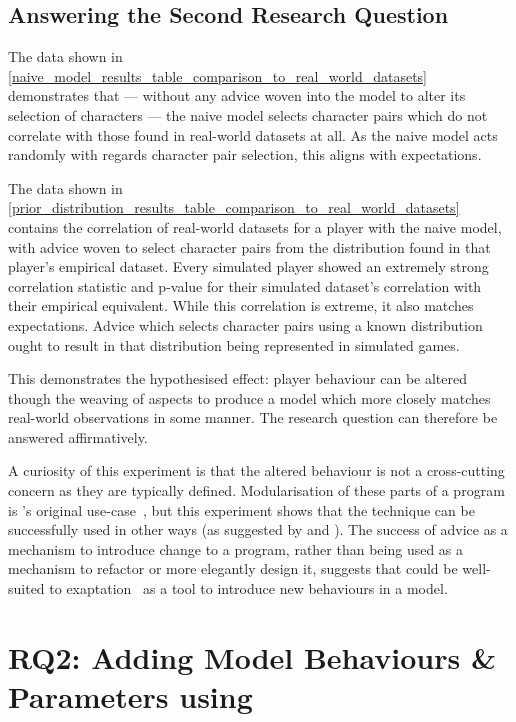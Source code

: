 \subsection{Answering the Second Research Question}

The data shown in
\cref{naive_model_results_table_comparison_to_real_world_datasets} demonstrates
that --- without any advice woven into the model to alter its selection of
characters --- the naive model selects character pairs which do not correlate
with those found in real-world datasets at all. As the naive model acts randomly
with regards character pair selection, this aligns with expectations.

The data shown in
\cref{prior_distribution_results_table_comparison_to_real_world_datasets}
contains the correlation of real-world datasets for a player with the naive
model, with advice woven to select character pairs from the distribution found
in that player's empirical dataset. Every simulated player showed an
extremely strong correlation statistic and p-value for their simulated dataset's
correlation with their empirical equivalent. While this correlation is extreme,
it also matches expectations. Advice which selects character pairs using a known
distribution ought to result in that distribution being represented in
simulated games.

This demonstrates the hypothesised effect: player behaviour can be altered
though the weaving of aspects to produce a model which more closely matches
real-world observations in some manner. The research question can therefore be
answered affirmatively.

A curiosity of this experiment is that the altered behaviour is not a
cross-cutting concern as they are typically defined. Modularisation of these
parts of a program is \aop{}'s original use-case~\cite{kiczales1997aspect}, but
this experiment shows that the technique can be successfully used in other ways
(as suggested by \citet{gulyas1999use} and \citet{steimann06paradoxical}). The
success of advice as a mechanism to introduce change to a program, rather than
being used as a mechanism to refactor or more elegantly design it, suggests that
\aop{} could be well-suited to exaptation~\cite{exaptation_origin} as a tool to
introduce new behaviours in a model.



\section{RQ2: Adding Model Behaviours \& Parameters using \AspectOrientation}
\label{sec:rq3}

